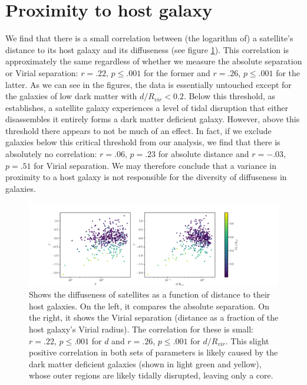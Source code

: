\section{Proximity to host galaxy}
We find that there is a small correlation between (the logarithm of) a satellite's distance to its host galaxy and its diffuseness (see figure \ref{fig:beta-d}). This correlation is approximately the same regardless of whether we measure the absolute separation or Virial separation: $r = .22$, $p \leq .001$ for the former and $r = .26$, $p \leq .001$ for the latter. As we can see in the figures, the data is essentially untouched except for the galaxies of low dark matter with $d / R_{vir} < 0.2$. Below this threshold, as \cite{morenoGalaxiesLackingDark2022} establishes, a satellite galaxy experiences a level of tidal disruption that either disassembles it entirely forms a dark matter deficient galaxy. However, above this threshold there appears to not be much of an effect. In fact, if we exclude galaxies below this critical threshold from our analysis, we find that there is absolutely no correlation: $r = .06$, $p = .23$ for absolute distance and $r = -.03$, $p = .51$ for Virial separation. We may therefore conclude that a variance in proximity to a host galaxy is not responsible for the diversity of diffuseness in galaxies.

\begin{figure}
    \centering
    \includegraphics*[width=\textwidth*11/10]{figs/me/beta-d.pdf}
    \caption{
        Shows the diffuseness of satellites as a function of distance to their host galaxies. On the left, it compares the absolute separation. On the right, it shows the Virial separation (distance as a fraction of the host galaxy's Virial radius). The correlation for these is small: $r = .22$, $p \leq .001$ for $d$ and $r = .26$, $p \leq .001$ for $d / R_{vir}$. This slight positive correlation in both sets of parameters is likely caused by the dark matter deficient galaxies (shown in light green and yellow), whose outer regions are likely tidally disrupted, leaving only a core.
    }
    \label{fig:beta-d}
\end{figure}


